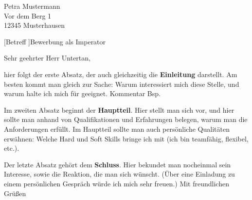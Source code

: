 
\emergencystretch=20pt%


\begin{letter}{%
        Petra Mustermann\\
        Vor dem Berg 1\\
        12345 Musterhausen%
    }

    [Betreff ]{Bewerbung als Imperator}
    \opening{Sehr geehrter Herr Untertan,}

    hier folgt der erste Absatz, der auch gleichzeitig die \textbf{Einleitung} darstellt. Am besten kommt man gleich zur Sache: Warum interessiert mich diese Stelle, und warum halte ich mich für geeignet.  Kommentar \glqq Bsp\grqq .

    Im zweiten Absatz beginnt der \textbf{Hauptteil}. Hier stellt man sich vor, und hier sollte man anhand von Qualifikationen und Erfahrungen belegen, warum man die Anforderungen erfüllt. Im Hauptteil sollte man auch persönliche Qualitäten erwähnen: Welche Hard und Soft Skills bringe ich mit (ich bin teamfähig, flexibel, etc.).

    Der letzte Absatz gehört dem \textbf{Schluss}. Hier bekundet man nocheinmal sein Interesse, sowie die Reaktion, die man sich wünscht. (Über eine Einladung zu einem persönlichen Gespräch würde ich mich sehr freuen.)
    \newline\newline\newline
    Mit freundlichen Grüßen\\\mySig%
\end{letter}
